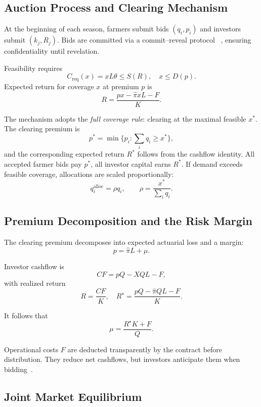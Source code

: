 \documentclass[11pt,a4paper]{article}
\begin{document}
		\subsection{Auction Process and Clearing Mechanism}\label{subsec:auction-process-and-clearing-mechanism}

		At the beginning of each season, farmers submit bids $(q_i, p_i)$ and investors submit $(k_j, R_j)$.
		Bids are committed via a commit--reveal protocol ~\parencite{blum1983coinflipping,buterin2015commit,parkes2014mechanism}, ensuring confidentiality until revelation.

		Feasibility requires
		\[
			C_{\mathrm{req}}(x) = xL\theta \leq S(R), \quad x \leq D(p).
		\]
		Expected return for coverage $x$ at premium $p$ is
		\[
			R = \frac{px - \hat{\pi}xL - F}{K}.
		\]

		The mechanism adopts the \emph{full coverage rule}: clearing at the maximal feasible $x^\ast$.
		The clearing premium is
		\[
			p^\ast = \min\{p_i : \sum_i q_i \geq x^\ast\},
		\]
		and the corresponding expected return $R^\ast$ follows from the cashflow identity.
		All accepted farmer bids pay $p^\ast$, all investor capital earns $R^\ast$.
		If demand exceeds feasible coverage, allocations are scaled proportionally:
		\[
			q_i^{\text{alloc}} = \rho q_i, \qquad \rho = \frac{x^\ast}{\sum_i q_i}.
		\]

		\subsection{Premium Decomposition and the Risk Margin}\label{subsec:premium-decomposition-and-the-risk-margin}

		The clearing premium decomposes into expected actuarial loss and a margin:
		\[
			p = \hat{\pi}L + \mu.
		\]

		Investor cashflow is
		\[
			CF = pQ - XQL - F,
		\]
		with realized return
		\[
			R = \frac{CF}{K}, \quad
			R^\star = \frac{pQ - \hat{\pi}QL - F}{K}.
		\]

		It follows that
		\[
			\mu = \frac{R^\star K + F}{Q}.
		\]

		Operational costs $F$ are deducted transparently by the contract before distribution.
		They reduce net cashflows, but investors anticipate them when bidding~\parencite{bowers1997actuarial}.

		\subsection{Joint Market Equilibrium}\label{subsec:joint-market-equilibrium}
\end{document}
